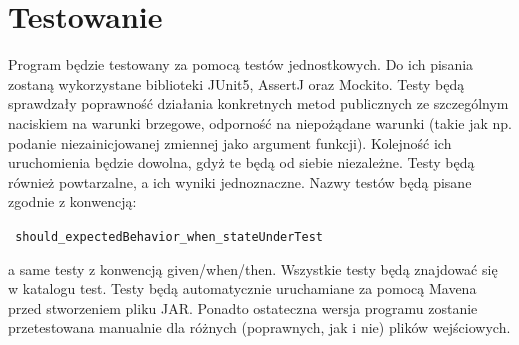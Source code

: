 \documentclass{article}
\begin{document}
\section{Testowanie}
{\fontsize{13}{13}\selectfont
    Program będzie testowany za pomocą testów jednostkowych. Do ich pisania zostaną wykorzystane biblioteki JUnit5, AssertJ oraz Mockito. Testy będą sprawdzały poprawność działania konkretnych metod publicznych ze szczególnym naciskiem na warunki brzegowe, odporność na niepożądane warunki (takie jak np. podanie niezainicjowanej zmiennej jako argument funkcji).
    Kolejność ich uruchomienia będzie dowolna, gdyż te będą od siebie niezależne. Testy będą również powtarzalne, a ich wyniki jednoznaczne.
    Nazwy testów będą pisane zgodnie z konwencją:
    
    \texttt{ should\_expectedBehavior\_when\_stateUnderTest }
    \setlength{\parindent}{0pt}
        
    a same testy z konwencją given/when/then.
    Wszystkie testy będą znajdować się w katalogu test.
    Testy będą automatycznie uruchamiane za pomocą Mavena przed stworzeniem pliku JAR.
    Ponadto ostateczna wersja programu zostanie przetestowana manualnie dla różnych (poprawnych, jak i nie) plików wejściowych.
    \setlength{\parindent}{12pt}
}
\end{document}
